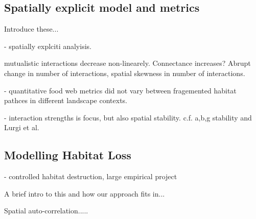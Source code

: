 \documentclass[12pt]{article}
\begin{document}
\subsection{Spatially explicit model and metrics}

Introduce these...

\cite{sole2006ecological}   - spatially explciti analyisis.

\cite{fortuna2013habitat} mutualistic interactions decrease non-linearely. Connectance increases? Abrupt change in number of interactions, spatial skewness in number of interactions.

\cite{kaartinen2011shrinking} - quantitative food web metrics did not vary between fragemented habitat pathces in different landscape contexts.

\cite{o2009perturbations} - interaction strengths is focus, but also spatial stability. c.f. a,b,g stability and Lurgi et al.

\subsection{Modelling Habitat Loss}

\cite{ewers2011large} - controlled habitat destruction, large empirical project

A brief intro to this and how our approach fits in...

Spatial auto-correlation.....






\end{document}
